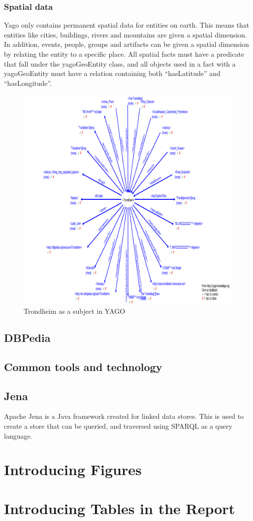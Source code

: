\subsubsection{Spatial data}
Yago only contains permanent spatial data for entities on earth. This means that entities like cities, buildings, rivers and mountains are given a spatial dimension. In addition, events, people, groups and artifacts can be given a spatial dimension by relating the entity to a specific place. All spatial facts must have a predicate that fall under the yagoGeoEntity class, and all objects used in a fact with a yagoGeoEntity must have a relation containing both ``hasLatitude'' and ``hasLongitude''.


\begin{figure}[t]
  \centering
  \includegraphics[scale=0.3]{figs/yago_trondheim.png}
 \caption{Trondheim as a subject in YAGO}
 \label{fig:1}
\end{figure}


\subsection{DBPedia}

\subsection{Common tools and technology}


\subsection{Jena}
Apache Jena is a Java framework created for linked data stores. This is used to create a store that can be queried, and traversed using SPARQL as a query language.  \\


\section{Introducing Figures}

\section{Introducing Tables in the Report}

\glsresetall

